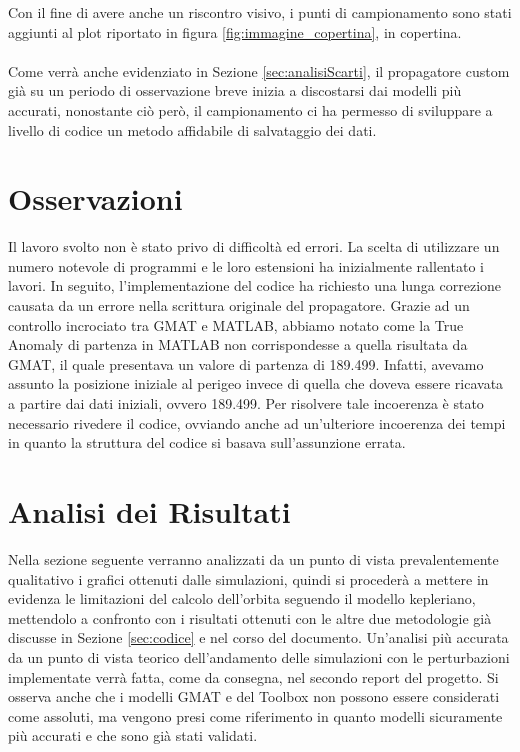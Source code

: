 \documentclass[12pt, a4paper]{article}
\begin{document}
Con il fine di avere anche un riscontro visivo, i punti di campionamento sono stati aggiunti al plot riportato in figura \ref{fig:immagine_copertina}, in copertina.\\
\\
Come verrà anche evidenziato in Sezione \ref{sec:analisiScarti}, il propagatore custom già su un periodo di osservazione breve inizia a discostarsi dai modelli più accurati, nonostante ciò però, il campionamento ci ha permesso di sviluppare a livello di codice un metodo affidabile di salvataggio dei dati.

\section{Osservazioni}
Il lavoro svolto non è stato privo di difficoltà ed errori. La scelta di utilizzare un numero notevole di programmi e le loro estensioni ha inizialmente rallentato i lavori.
In seguito, l'implementazione del codice ha richiesto una lunga correzione causata da un errore nella scrittura originale del propagatore. Grazie ad un controllo incrociato tra GMAT e MATLAB, abbiamo notato come la True Anomaly di partenza in MATLAB non corrispondesse a quella risultata da GMAT, il quale presentava un valore di partenza di 189.499\degree. Infatti, avevamo assunto la posizione iniziale al perigeo invece di quella che doveva essere ricavata a partire dai dati iniziali, ovvero 189.499\degree.  Per risolvere tale incoerenza è stato necessario rivedere il codice, ovviando anche ad un'ulteriore incoerenza dei tempi in quanto la struttura del codice si basava sull'assunzione errata.  

\section{Analisi dei Risultati}
\label{sec:analisiRis}
Nella sezione seguente verranno analizzati da un punto di vista prevalentemente qualitativo i grafici ottenuti dalle simulazioni, quindi si procederà a mettere in evidenza le limitazioni del calcolo dell'orbita seguendo il modello kepleriano, mettendolo a confronto con i risultati ottenuti con le altre due metodologie già discusse in Sezione \ref{sec:codice} e nel corso del documento. Un'analisi più accurata da un punto di vista teorico dell'andamento delle simulazioni con le perturbazioni implementate verrà fatta, come da consegna, nel secondo report del progetto. Si osserva anche che i modelli GMAT e del Toolbox non possono essere considerati come assoluti, ma vengono presi come riferimento in quanto modelli sicuramente più accurati e che sono già stati validati.
\end{document}
